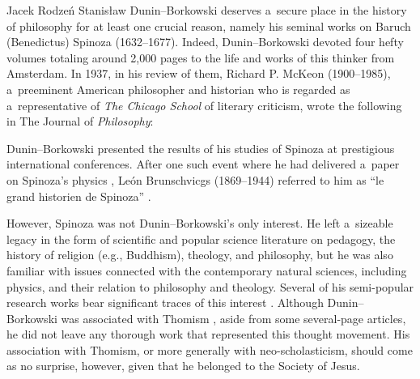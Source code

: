 \begin{artengenv}{Jacek Rodzeń}
Stanisław Dunin–Borkowski deserves a~secure place in the history of philosophy for at least one crucial reason, namely his seminal works on Baruch (Benedictus) Spinoza (1632–1677). Indeed, Dunin–Borkowski devoted four hefty volumes totaling around 2,000 pages to the life and works of this thinker from Amsterdam. In 1937, in his review of them, Richard P. McKeon (1900–1985), a~preeminent American philosopher and historian who is regarded as a~representative of \textit{The Chicago School} of literary criticism, wrote the following in The Journal of \textit{Philosophy}:

Dunin–Borkowski presented the results of his studies of Spinoza at prestigious international conferences. After one such event where he had delivered a~paper on Spinoza's physics
\parencite[][]{dunin-borkowski_aus_1933}, %
 León Brunschvicgs (1869–1944) referred to him as ``le grand historien de Spinoza'' 
\parencite[][p.427]{brunschvicg_septimana_1934}.%


However, Spinoza was not Dunin–Borkowski's only interest. He left a~sizeable legacy in the form of scientific and popular science literature on pedagogy, the history of religion (e.g., Buddhism), theology, and philosophy, but he was also familiar with issues connected with the contemporary natural sciences, including physics, and their relation to philosophy and theology. Several of his semi-popular research works bear significant traces of this interest
\parencites[cf.][]{dunin-borkowski_popularer_1898}[][]{dunin-borkowski_wissenschaft_1911}. %
 Although Dunin–Borkowski was associated with Thomism 
\parencites[][]{dunin-borkowski_auf_1921}[][]{dunin-borkowski_neue_1921}[also][p.141]{siwek_stanislaw_1935}[][pp.306–307]{siwek_spinoza_1938}, %
 aside from some several-page articles, he did not leave any thorough work that represented this thought movement. His association with Thomism, or more generally with neo-scholasticism, should come as no surprise, however, given that he belonged to the Society of Jesus.


\end{artengenv}

